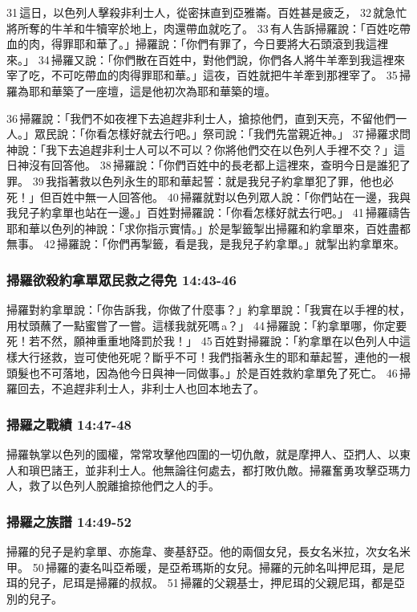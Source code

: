 31 這日，以色列人擊殺非利士人，從密抹直到亞雅崙。百姓甚是疲乏， 32 就急忙將所奪的牛羊和牛犢宰於地上，肉還帶血就吃了。 33 有人告訴掃羅說：「百姓吃帶血的肉，得罪耶和華了。」掃羅說：「你們有罪了，今日要將大石頭滾到我這裡來。」 34 掃羅又說：「你們散在百姓中，對他們說，你們各人將牛羊牽到我這裡來宰了吃，不可吃帶血的肉得罪耶和華。」這夜，百姓就把牛羊牽到那裡宰了。 35 掃羅為耶和華築了一座壇，這是他初次為耶和華築的壇。

36 掃羅說：「我們不如夜裡下去追趕非利士人，搶掠他們，直到天亮，不留他們一人。」眾民說：「你看怎樣好就去行吧。」祭司說：「我們先當親近神。」 37 掃羅求問神說：「我下去追趕非利士人可以不可以？你將他們交在以色列人手裡不交？」這日神沒有回答他。 38 掃羅說：「你們百姓中的長老都上這裡來，查明今日是誰犯了罪。 39 我指著救以色列永生的耶和華起誓：就是我兒子約拿單犯了罪，他也必死！」但百姓中無一人回答他。 40 掃羅就對以色列眾人說：「你們站在一邊，我與我兒子約拿單也站在一邊。」百姓對掃羅說：「你看怎樣好就去行吧。」 41 掃羅禱告耶和華以色列的神說：「求你指示實情。」於是掣籤掣出掃羅和約拿單來，百姓盡都無事。 42 掃羅說：「你們再掣籤，看是我，是我兒子約拿單。」就掣出約拿單來。

\subsubsection{掃羅欲殺約拿單眾民救之得免 14:43-46}
掃羅對約拿單說：「你告訴我，你做了什麼事？」約拿單說：「我實在以手裡的杖，用杖頭蘸了一點蜜嘗了一嘗。這樣我就死嗎 a？」 44 掃羅說：「約拿單哪，你定要死！若不然，願神重重地降罰於我！」 45 百姓對掃羅說：「約拿單在以色列人中這樣大行拯救，豈可使他死呢？斷乎不可！我們指著永生的耶和華起誓，連他的一根頭髮也不可落地，因為他今日與神一同做事。」於是百姓救約拿單免了死亡。 46 掃羅回去，不追趕非利士人，非利士人也回本地去了。

\subsubsection{掃羅之戰績 14:47-48}
掃羅執掌以色列的國權，常常攻擊他四圍的一切仇敵，就是摩押人、亞捫人、以東人和瑣巴諸王，並非利士人。他無論往何處去，都打敗仇敵。掃羅奮勇攻擊亞瑪力人，救了以色列人脫離搶掠他們之人的手。

\subsubsection{掃羅之族譜 14:49-52}
掃羅的兒子是約拿單、亦施韋、麥基舒亞。他的兩個女兒，長女名米拉，次女名米甲。 50 掃羅的妻名叫亞希暖，是亞希瑪斯的女兒。掃羅的元帥名叫押尼珥，是尼珥的兒子，尼珥是掃羅的叔叔。 51 掃羅的父親基士，押尼珥的父親尼珥，都是亞別的兒子。

